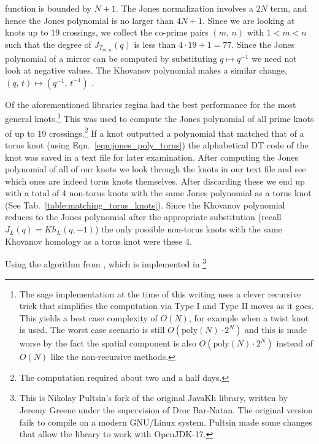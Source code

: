 function is bounded by $N+1$. The Jones normalization involves a $2N$ term,
and hence the Jones polynomial is no larger than $4N+1$.
Since we are looking at knots up to $19$ crossings, we collect the
co-prime pairs $(m,\,n)$ with $1<m<n$ such that the degree of
$J_{T_{m,\,n}}(q)$
is less than $4\cdot{19}+1=77$. Since the Jones polynomial of a mirror
can be computed by substituting $q\mapsto{q}^{-1}$ we need not look at
negative values. The Khovanov polynomial makes a similar change,
$(q,\,t)\mapsto(q^{-1},\,t^{-1})$ \cite{WATSON2017915}.
\par\hfill\par
Of the aforementioned libraries regina had the best performance for the most
general knots.\footnote{%
    The sage implementation at the time of this writing uses a clever recursive
    trick that simplifies the computation via Type I and Type II moves as it
    goes. This yields a best case complexity of $O(N)$, for example when a
    twist knot is used. The worst case scenario is still
    $O(\textrm{poly}(N)\cdot{2}^{N})$ and this
    is made worse by the fact the spatial component is also
    $O(\textrm{poly}(N)\cdot{2}^{N})$ instead
    of $O(N)$ like the non-recursive methods.
}
This was used to compute the Jones polynomial of all prime knots of up to
19 crossings.\footnote{%
    The computation required about two and a half days.
}
If a knot outputted a polynomial that matched that of a torus
knot (using Eqn.~\ref{eqn:jones_poly_torus}) the alphabetical DT code of the
knot was saved in a text file for later examination. After computing the Jones
polynomial of all of our knots we look through the knots in our text file and
see which ones are indeed torus knots themselves. After discarding these
we end up with a total of 4 non-torus knots with the same Jones polynomial as a
torus knot (See Tab.~\ref{table:matching_torus_knots}).
Since the Khovanov polynomial reduces to the Jones polynomial after the
appropriate substitution
(recall $J_{L}(q)=Kh_{L}(q,-1)$) the only possible non-torus knots with
the same Khovanov homology as a torus knot were these 4.
\par\hfill\par
Using the algorithm from \cite{BarNatan2006FASTKH}, which is implemented in
\cite{JavaKhv2}\footnote{
    This is Nikolay Pultsin's fork of the original JavaKh library, written by
    Jeremy Greene under the supervision of Dror Bar-Natan. The original version
    fails to compile on a modern GNU/Linux system. Pultsin made some changes
    that allow the library to work with OpenJDK-17.
}
